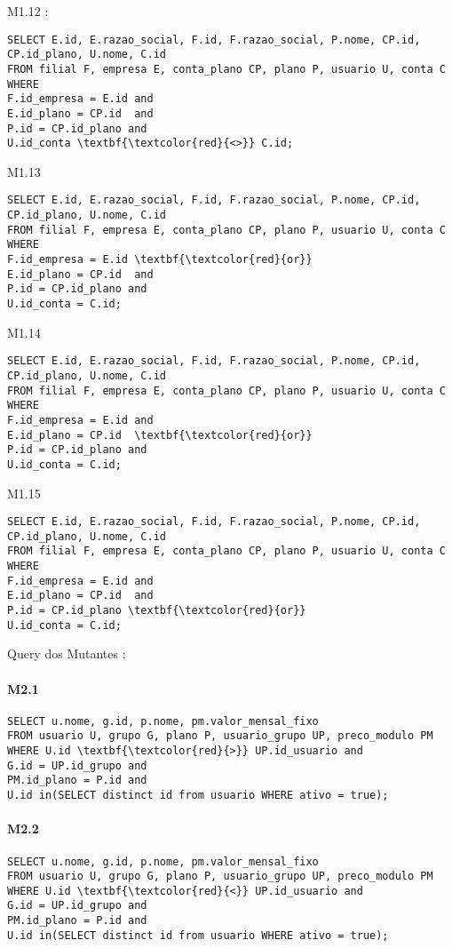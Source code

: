 M1.12 :
\begin{Verbatim}
SELECT E.id, E.razao_social, F.id, F.razao_social, P.nome, CP.id, CP.id_plano, U.nome, C.id
FROM filial F, empresa E, conta_plano CP, plano P, usuario U, conta C
WHERE 
F.id_empresa = E.id and
E.id_plano = CP.id  and
P.id = CP.id_plano and
U.id_conta \textbf{\textcolor{red}{<>}} C.id;
\end{Verbatim}


M1.13
\begin{Verbatim}
SELECT E.id, E.razao_social, F.id, F.razao_social, P.nome, CP.id, CP.id_plano, U.nome, C.id
FROM filial F, empresa E, conta_plano CP, plano P, usuario U, conta C
WHERE 
F.id_empresa = E.id \textbf{\textcolor{red}{or}}
E.id_plano = CP.id  and
P.id = CP.id_plano and
U.id_conta = C.id;
\end{Verbatim}



M1.14
\begin{Verbatim}
SELECT E.id, E.razao_social, F.id, F.razao_social, P.nome, CP.id, CP.id_plano, U.nome, C.id
FROM filial F, empresa E, conta_plano CP, plano P, usuario U, conta C
WHERE 
F.id_empresa = E.id and
E.id_plano = CP.id  \textbf{\textcolor{red}{or}}
P.id = CP.id_plano and
U.id_conta = C.id;
\end{Verbatim}

M1.15
\begin{Verbatim}
SELECT E.id, E.razao_social, F.id, F.razao_social, P.nome, CP.id, CP.id_plano, U.nome, C.id
FROM filial F, empresa E, conta_plano CP, plano P, usuario U, conta C
WHERE 
F.id_empresa = E.id and
E.id_plano = CP.id  and
P.id = CP.id_plano \textbf{\textcolor{red}{or}}
U.id_conta = C.id;
\end{Verbatim}



Query dos Mutantes :

\paragraph{M2.1}
\begin{Verbatim}
SELECT u.nome, g.id, p.nome, pm.valor_mensal_fixo
FROM usuario U, grupo G, plano P, usuario_grupo UP, preco_modulo PM
WHERE U.id \textbf{\textcolor{red}{>}} UP.id_usuario and
G.id = UP.id_grupo and
PM.id_plano = P.id and
U.id in(SELECT distinct id from usuario WHERE ativo = true);
\end{Verbatim}

\paragraph{M2.2}
\begin{Verbatim}
SELECT u.nome, g.id, p.nome, pm.valor_mensal_fixo
FROM usuario U, grupo G, plano P, usuario_grupo UP, preco_modulo PM
WHERE U.id \textbf{\textcolor{red}{<}} UP.id_usuario and
G.id = UP.id_grupo and
PM.id_plano = P.id and
U.id in(SELECT distinct id from usuario WHERE ativo = true);
\end{Verbatim}

